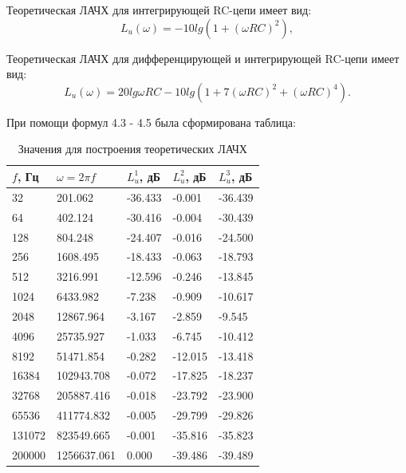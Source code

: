 Теоретическая ЛАЧХ для интегрирующей RC-цепи имеет вид:
\begin{equation}
L_u(\omega) = -10lg(1+(\omega RC)^2),
\end{equation}

Теоретическая ЛАЧХ для дифференцирующей и интегрирующей RC-цепи имеет вид:
\begin{equation}
L_u(\omega) = 20lg \omega RC - 10lg(1+7(\omega RC)^2 + (\omega RC)^4).
\end{equation}

При помощи формул 4.3 - 4.5 была сформирована таблица:
\begin{table}[H]
	\begin{center}
	\caption{Значения для построения теоретических ЛАЧХ}
	\def\arraystretch{1.5}
		\begin{tabularx}{\textwidth}{|X|X|X|X|X|}
			\hline
			$f$, Гц & $\omega = 2 \pi f$ & $L_u^1$, дБ & $L_u^2$, дБ & $L_u^3$, дБ\\\hline	
			32 & 201.062 & -36.433 & -0.001 & -36.439\\\hline
			64 & 402.124 & -30.416 & -0.004 & -30.439\\\hline
			128 & 804.248 & -24.407 & -0.016 & -24.500\\\hline
			256 & 1608.495 & -18.433 & -0.063 & -18.793\\\hline
			512 & 3216.991 & -12.596 & -0.246 & -13.845\\\hline
			1024 & 6433.982 & -7.238 & -0.909 & -10.617\\\hline
			2048 & 12867.964 & -3.167 & -2.859 & -9.545\\\hline
			4096 & 25735.927 & -1.033 & -6.745 & -10.412\\\hline
			8192 & 51471.854 & -0.282 & -12.015 & -13.418\\\hline
			16384 & 102943.708 & -0.072 & -17.825 & -18.237\\\hline
			32768 & 205887.416 & -0.018 & -23.792 & -23.900\\\hline
			65536 & 411774.832 & -0.005 & -29.799 & -29.826\\\hline
			131072 & 823549.665 & -0.001 & -35.816 & -35.823\\\hline
			200000 & 1256637.061 & 0.000 & -39.486 & -39.489\\\hline

		\end{tabularx}
		\label{tabular:0}
	\end{center}
\end{table}

